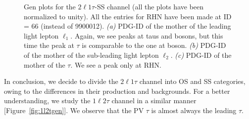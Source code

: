 \documentclass[letterpaper,12pt]{article}
\begin{document}
\begin{figure}[h]
\centering
{}%
\quad
{}%
\quad
{}%
\quad

\caption[Gen plots for \2l1t-SS]{Gen plots for the $2\ell1\tau$-SS channel (all the plots have been normalized to unity). All the entries for RHN have been made at ID = 66 (instead of 9900012). \emph{(a)} PDG-ID of the mother of the leading light lepton $\ell_{1}$. Again, we see peaks at taus and \Wboson{} bosons, but this time the peak at $\tau$ is comparable to the one at \Wboson{} boson. \emph{(b)} PDG-ID of the mother of the sub-leading light lepton $\ell_{2}$. \emph{(c)} PDG-ID of the mother of the $\tau$. We see a peak only at RHN.}
\label{fig:2l1tSSgen}  
\end{figure}

In conclusion, we decide to divide the $2\ell1\tau$ channel into OS and SS categories, owing to the differences in their production and backgrounds. For a better understanding, we study the $1\ell2\tau$ channel in a similar manner [Figure~\ref{fig:1l2tgen}]. We observe that the PV $\tau$ is almost always the leading $\tau$.
\end{document}
